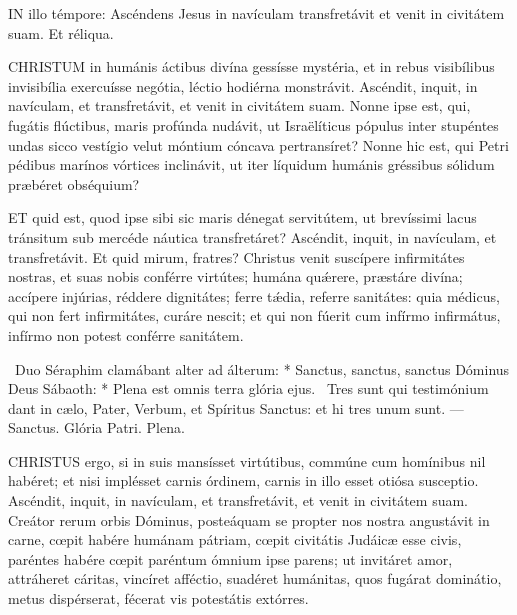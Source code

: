 
\lettrine[lines=2]{I}{N} illo témpore: Ascéndens Jesus in navículam transfretávit et venit in civitátem suam. Et réliqua.



\lettrine[lines=2]{C}{HRISTUM} in humánis áctibus divína gessísse mystéria, et in rebus visibílibus invisibília exercuísse negótia, léctio hodiérna monstrávit. Ascéndit, inquit, in navículam, et transfretávit, et venit in civitátem suam. Nonne ipse est, qui, fugátis flúctibus, maris profúnda nudávit, ut Israëlíticus pópulus inter stupéntes undas sicco vestígio velut móntium cóncava pertransíret? Nonne hic est, qui Petri pédibus marínos vórtices inclinávit, ut iter líquidum humánis gréssibus sólidum præbéret obséquium?



\lettrine[lines=2]{E}{T} quid est, quod ipse sibi sic maris dénegat servitútem, ut brevíssimi lacus tránsitum sub mercéde náutica transfretáret? Ascéndit, inquit, in navículam, et transfretávit. Et quid mirum, fratres? Christus venit suscípere infirmitátes nostras, et suas nobis conférre virtútes; humána quǽrere, præstáre divína; accípere injúrias, réddere dignitátes; ferre tǽdia, referre sanitátes: quia médicus, qui non fert infirmitátes, curáre nescit; et qui non fúerit cum infírmo infirmátus, infírmo non potest conférre sanitátem.

\R\ Duo Séraphim clamábant alter ad álterum: * Sanctus, sanctus, sanctus Dóminus Deus Sábaoth: * Plena est omnis terra glória ejus. \V\ Tres sunt qui testimónium dant in cælo, Pater, Verbum, et Spíritus Sanctus: et hi tres unum sunt. — Sanctus. Glória Patri. Plena.


\lettrine[lines=2]{C}{HRISTUS} ergo, si in suis mansísset virtútibus, commúne cum homínibus nil habéret; et nisi implésset carnis órdinem, carnis in illo esset otiósa susceptio. Ascéndit, inquit, in navículam, et transfretávit, et venit in civitátem suam. Creátor rerum orbis Dóminus, posteáquam se propter nos nostra angustávit in carne, cœpit habére humánam pátriam, cœpit civitátis Judáicæ esse civis, paréntes habére cœpit paréntum ómnium ipse parens; ut invitáret amor, attráheret cáritas, vincíret afféctio, suadéret humánitas, quos fugárat dominátio, metus dispérserat, fécerat vis potestátis extórres.


